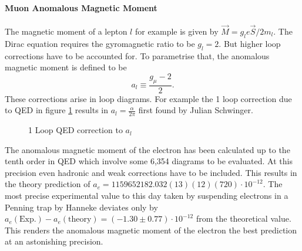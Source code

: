 \paragraph{Muon Anomalous Magnetic Moment}
The magnetic moment of a lepton $l$ for example is given by $\vec{M}=	g_l  e \vec{S} / 2m_l$. The Dirac equation requires the gyromagnetic ratio to be $g_l=2$. But higher loop corrections have to be accounted for. To parametrise that, the anomalous magnetic moment is defined to be 
\begin{equation}
a_l \equiv \frac{g_\mu-2}{2}.
\end{equation}
These corrections arise in loop diagrams. For example the 1 loop correction due to QED in figure \ref{fg:QEDCorrection} results in $a_l=\frac{\alpha}{2\pi}$ first found by Julian Schwinger. 
\begin{figure}[H]
\centering
{}
\caption{1 Loop QED correction to $	a_l$}
\label{fg:QEDCorrection}
\end{figure}
The anomalous magnetic moment of the electron has been calculated up to the tenth order in QED \cite{Aoyama:2017uqe} which involve some 6,354 diagrams to be evaluated. At this precision even hadronic and weak corrections have to be included. This results in the theory prediction of  $a_e=1 159 652 182.032 (13)(12)(720)\cdot 10^{-12}$.
The most precise experimental value to this day taken by suspending electrons in a Penning trap by Hanneke \cite{Hanneke:2010au}	 deviates only by $a_e(\text{Exp.})-a_e(\text{theory})=(-1.30\pm0.77)\cdot 10^{-12}$ from the theoretical value. This renders the anomalous magnetic moment of the electron the best prediction at an astonishing precision.

